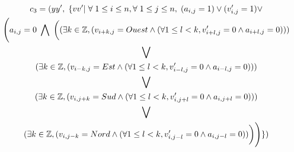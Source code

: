 \documentclass[a4paper,11pt]{article}
\begin{document}
\begin{itemize}
  \begin{multline}
    c_{3} = ( yy',\hspace{0.1cm} \{ vv' |\hspace{0.1cm} \forall \hspace{0.1cm} 1\leq i \leq n, \forall \hspace{0.1cm} 1\leq j \leq n, \hspace{0.1cm} (a_{i,j}=1) \vee (v'_{i,j} = 1) \vee \\ \Bigg(a_{i,j} = 0\hspace{0.1cm} \bigwedge \hspace{0.1cm} \bigg(
    (\exists k \in \mathbb{Z} , (v_ {i+k,j} = Ouest \wedge (\forall 1 \leq l < k, v'_{i+l,j}=0
    \wedge a_{i+l,j}=0))) \\
    \bigvee \\
    (\exists k \in \mathbb{Z} , (v_ {i-k,j} = Est \wedge (\forall 1 \leq l < k, v'_{i-l,j}=0
    \wedge a_{i-l,j}=0))) \\
    \bigvee \\
    (\exists k \in \mathbb{Z} , (v_ {i,j+k} = Sud \wedge (\forall 1 \leq l < k, v'_{i,j+l}=0
    \wedge a_{i,j+l}=0))) \\
    \bigvee \\
    (\exists k \in \mathbb{Z} , (v_ {i,j-k} = Nord \wedge (\forall 1 \leq l < k, v'_{i,j-l}=0
    \wedge a_{i,j-l}=0))\bigg)
    \Bigg)\}
    )
  \end{multline}
  
\end{itemize}
\end{document}
